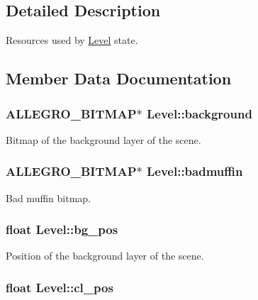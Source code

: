 \subsection{\-Detailed \-Description}
\-Resources used by \hyperlink{structLevel}{\-Level} state. 

\subsection{\-Member \-Data \-Documentation}
\hypertarget{structLevel_a4b4dd31284206502977b3d5b95d52abc}{
\subsubsection[{background}]{\setlength{\rightskip}{0pt plus 5cm}\-A\-L\-L\-E\-G\-R\-O\-\_\-\-B\-I\-T\-M\-A\-P$\ast$ {\bf \-Level\-::background}}}\label{structLevel_a4b4dd31284206502977b3d5b95d52abc}
\-Bitmap of the background layer of the scene. \hypertarget{structLevel_addc469e6a9843c509fc640a4e625fa50}{
\subsubsection[{badmuffin}]{\setlength{\rightskip}{0pt plus 5cm}\-A\-L\-L\-E\-G\-R\-O\-\_\-\-B\-I\-T\-M\-A\-P$\ast$ {\bf \-Level\-::badmuffin}}}\label{structLevel_addc469e6a9843c509fc640a4e625fa50}
\-Bad muffin bitmap. \hypertarget{structLevel_a00321214fdc30f67615053d1ca614948}{
\subsubsection[{bg\-\_\-pos}]{\setlength{\rightskip}{0pt plus 5cm}float {\bf \-Level\-::bg\-\_\-pos}}}\label{structLevel_a00321214fdc30f67615053d1ca614948}
\-Position of the background layer of the scene. \hypertarget{structLevel_af466533be369b5ce1f48196a7f3b7b0b}{
\subsubsection[{cl\-\_\-pos}]{\setlength{\rightskip}{0pt plus 5cm}float {\bf \-Level\-::cl\-\_\-pos}}}\label{structLevel_af466533be369b5ce1f48196a7f3b7b0b}
